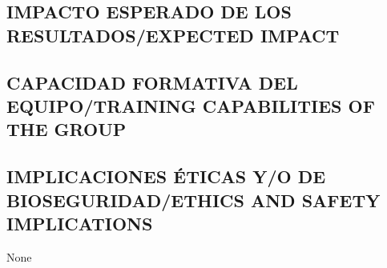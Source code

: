 \documentclass[a4paper,11pt,oneside]{article}
\begin{document}
\subsection{\sc IMPACTO ESPERADO DE LOS RESULTADOS/EXPECTED IMPACT}

%
%
%
%
\subsection{\sc CAPACIDAD FORMATIVA DEL EQUIPO/TRAINING CAPABILITIES OF THE GROUP}


%
%
%
%

\subsection{\sc IMPLICACIONES ÉTICAS Y/O DE BIOSEGURIDAD/ETHICS AND SAFETY IMPLICATIONS}

None
\end{document}
